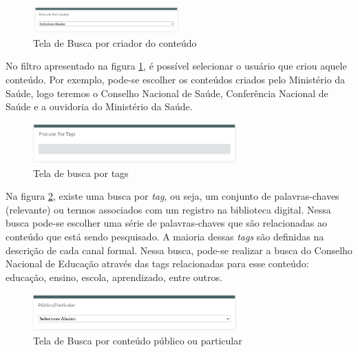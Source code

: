 \graphicspath{{figuras/prototipo/}}
\begin{figure}[H]
\centering
\includegraphics[width=0.5\textwidth]{busca-criador}
\caption{Tela de Busca por criador do conteúdo}
\label{fig:buscacriador_prototipo}
\end{figure}

No filtro apresentado na figura \ref{fig:buscacriador_prototipo}, é possível selecionar o usuário que criou aquele conteúdo. Por exemplo, pode-se escolher os conteúdos criados pelo Ministério da Saúde, logo teremos o Conselho Nacional de Saúde, Conferência Nacional de Saúde e a ouvidoria do Ministério da Saúde.

\graphicspath{{figuras/prototipo/}}
\begin{figure}[H]
\centering
\includegraphics[width=0.7\textwidth]{busca-tags}
\caption{Tela de busca por tags}
\label{fig:buscatags_prototipo}
\end{figure}

Na figura \ref{fig:buscatags_prototipo}, existe uma busca por \textit{tag}, ou seja, um conjunto de palavras-chaves (relevante) ou termos associados com um registro na biblioteca digital. Nessa busca pode-se escolher uma série de palavras-chaves que são relacionadas ao conteúdo que está sendo pesquisado. A maioria dessas \textit{tags} são definidas na descrição de cada canal formal. Nessa busca, pode-se realizar a busca do Conselho Nacional de Educação através das tags relacionadas para esse conteúdo: educação, ensino, escola, aprendizado, entre outros.

\graphicspath{{figuras/prototipo/}}
\begin{figure}[H]
\centering
\includegraphics[width=0.7\textwidth]{busca-pub-particular}
\caption{Tela de Busca por conteúdo público ou particular}
\label{fig:buscaconteudo_prototipo}
\end{figure}

